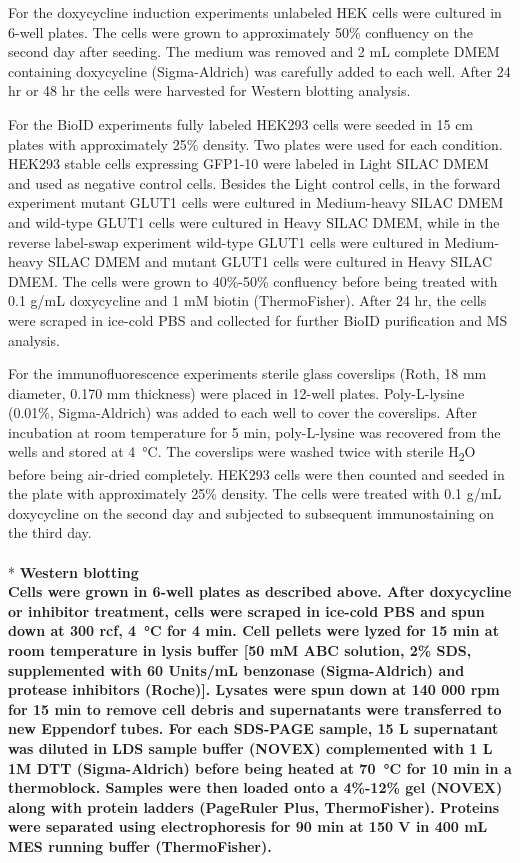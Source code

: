For the doxycycline induction experiments unlabeled HEK cells were cultured in 6-well plates. The cells were grown to approximately 50\% confluency on the second day after seeding. The medium was removed and 2 mL complete DMEM containing doxycycline (Sigma-Aldrich) was carefully added to each well. After 24 hr or 48 hr the cells were harvested for Western blotting analysis.

For the BioID experiments fully labeled HEK293 cells were seeded in 15 cm plates with approximately 25\% density. Two plates were used for each condition. HEK293 stable cells expressing GFP1-10 were labeled in Light SILAC DMEM and used as negative control cells. Besides the Light control cells, in the forward experiment mutant GLUT1 cells were cultured in Medium-heavy SILAC DMEM and wild-type GLUT1 cells were cultured in Heavy SILAC DMEM, while in the reverse label-swap experiment wild-type GLUT1 cells were cultured in Medium-heavy SILAC DMEM and mutant GLUT1 cells were cultured in Heavy SILAC DMEM. The cells were grown to 40\%-50\% confluency before being treated with 0.1 {}\textmu g/mL doxycycline and 1 mM biotin (ThermoFisher). After 24 hr, the cells were scraped in ice-cold PBS and collected for further BioID purification and MS analysis.

For the immunofluorescence experiments sterile glass coverslips (Roth, 18 mm diameter, 0.170 mm thickness) were placed in 12-well plates. Poly-L-lysine (0.01\%, Sigma-Aldrich) was added to each well to cover the coverslips. After incubation at room temperature for 5 min, poly-L-lysine was recovered from the wells and stored at \SI{4}{\celsius}. The coverslips were washed twice with sterile H\textsubscript{2}O before being air-dried completely. HEK293 cells were then counted and seeded in the plate with approximately 25\% density. The cells were treated with 0.1 {}\textmu g/mL doxycycline on the second day and subjected to subsequent immunostaining on the third day.
\\
\\*
\bfseries{Western blotting}\\
\normalfont Cells were grown in 6-well plates as described above. After doxycycline or inhibitor treatment, cells were scraped in ice-cold PBS and spun down at 300 rcf, \SI{4}{\celsius} for 4 min. Cell pellets were lyzed for 15 min at room temperature in lysis buffer [50 mM ABC solution, 2\% SDS, supplemented with 60 Units/mL benzonase (Sigma-Aldrich) and protease inhibitors (Roche)]. Lysates were spun down at 140 000 rpm for 15 min to remove cell debris and supernatants were transferred to new Eppendorf tubes. For each SDS-PAGE sample, 15 {}\textmu L supernatant was diluted in LDS sample buffer (NOVEX) complemented with 1 {}\textmu L 1M DTT (Sigma-Aldrich) before being heated at \SI{70}{\celsius} for 10 min in a thermoblock. Samples were then loaded onto a 4\%-12\% gel (NOVEX) along with protein ladders (PageRuler Plus, ThermoFisher). Proteins were separated using electrophoresis for 90 min at 150 V in 400 mL MES running buffer (ThermoFisher). 

